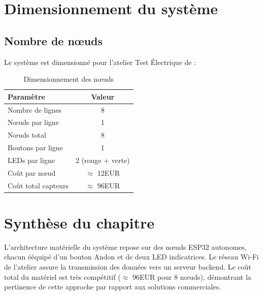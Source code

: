\section{Dimensionnement du syst\`eme}

\subsection{Nombre de n\oe{}uds}

Le syst\`eme est dimensionn\'e pour l'atelier Test \'Electrique de \sews :

\begin{table}[htbp]
\centering
\renewcommand{\arraystretch}{1.3}
\begin{tabular}{l c}
\toprule
\textbf{Param\`etre} & \textbf{Valeur} \\
\midrule
Nombre de lignes & 8 \\
N\oe{}uds par ligne & 1 \\
N\oe{}uds total & 8 \\
Boutons par ligne & 1 \\
LEDs par ligne & 2 (rouge + verte) \\
Co\^ut par n\oe{}ud & $\approx$ 12EUR \\
Co\^ut total capteurs & $\approx$ 96EUR \\
\bottomrule
\end{tabular}
\caption{Dimensionnement des n\oe{}uds}
\label{tab:dimensionnement}
\end{table}

\section{Synth\`ese du chapitre}

L'architecture mat\'erielle du syst\`eme repose sur des n\oe{}uds ESP32 autonomes, chacun \'e\'equip\'e d'un bouton Andon et de deux LED indicatrices. Le r\'eseau Wi-Fi de l'atelier assure la transmission des donn\'ees vers un serveur backend. Le co\^ut total du mat\'eriel est tr\`es comp\'etitif ($\approx$ 96EUR pour 8 n\oe{}uds), d\'emontrant la pertinence de cette approche par rapport aux solutions commerciales.

